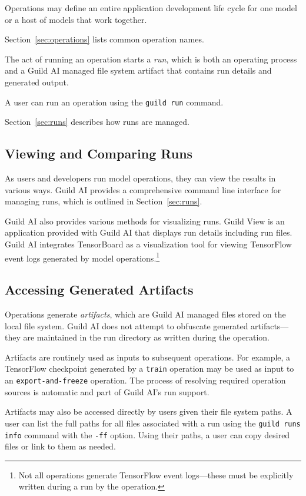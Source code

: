 \documentclass{article}
\begin{document}
Operations may define an entire application development life cycle for
one model or a host of models that work together.

Section~\ref{sec:operations} lists common operation names.

The act of running an operation starts a \emph{run}, which is both an
operating process and a Guild AI managed file system artifact that
contains run details and generated output.

A user can run an operation using the \verb|guild run| command.

Section~\ref{sec:runs} describes how runs are managed.

\subsection{Viewing and Comparing Runs}

As users and developers run model operations, they can view the
results in various ways. Guild AI provides a comprehensive command
line interface for managing runs, which is outlined in
Section~\ref{sec:runs}.

Guild AI also provides various methods for visualizing runs. Guild
View is an application provided with Guild AI that displays run
details including run files. Guild AI integrates TensorBoard \cite{tb}
as a visualization tool for viewing TensorFlow event logs generated by
model operations.\footnote{Not all operations generate TensorFlow
  event logs---these must be explicitly written during a run by the
  operation.}

\subsection{Accessing Generated Artifacts}

Operations generate \emph{artifacts}, which are Guild AI managed files
stored on the local file system. Guild AI does not attempt to
obfuscate generated artifacts---they are maintained in the run
directory as written during the operation.

Artifacts are routinely used as inputs to subsequent operations. For
example, a TensorFlow checkpoint generated by a \verb|train| operation
may be used as input to an \verb|export-and-freeze| operation. The
process of resolving required operation sources is automatic and part
of Guild AI's run support.

Artifacts may also be accessed directly by users given their file
system paths. A user can list the full paths for all files associated
with a run using the \verb|guild runs info| command with the
\verb|-ff| option. Using their paths, a user can copy desired files or
link to them as needed.
\end{document}

